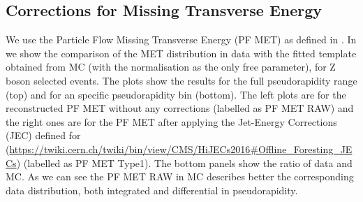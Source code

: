 \subsection{Corrections for Missing Transverse Energy} \label{sec:WBoson_Analysis_WBoson_Analysis_Corrections}

We use the Particle Flow Missing Transverse Energy (PF MET) as defined in . In  we show the comparison of the MET distribution in data with the fitted template obtained from MC (with the normalisation as the only free parameter), for Z boson selected events. The plots show the results for the full pseudorapidity range (top) and for an specific pseudorapidity bin (bottom). The left plots are for the reconstructed PF MET without any corrections (labelled as PF MET RAW) and the right ones are for the PF MET after applying the Jet-Energy Corrections (JEC) defined for \pPb (\url{https://twiki.cern.ch/twiki/bin/view/CMS/HiJECs2016#Offline_Foresting_JECs}) (labelled as PF MET Type1). The bottom panels show the ratio of data and MC. As we can see the PF MET RAW in MC describes better the corresponding data distribution, both integrated and differential in pseudorapidity.

